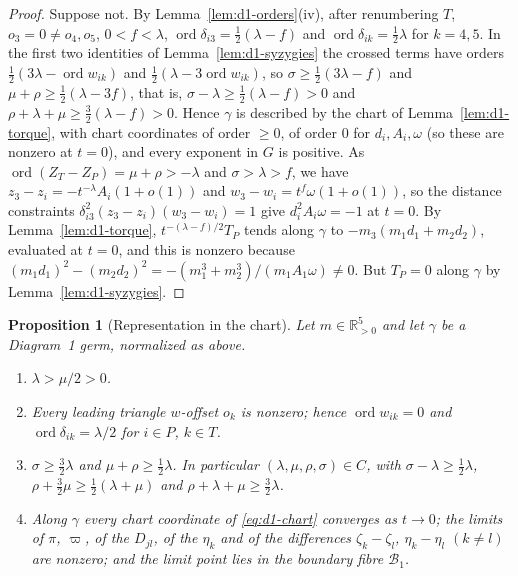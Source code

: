 \documentclass[Threeside,11pt]{article}
\newtheorem{proposition}[theorem]{Proposition}
\theoremstyle{definition}
\theoremstyle{remark}
\numberwithin{equation}{section}
\theoremstyle{remark}
\newcommand{\Rp}{\mathbb{R}_{>0}}
\newcommand{\ord}{\operatorname{ord}}
\newenvironment{romanlist}{\begin{enumerate}\renewcommand{\labelenumi}{(\roman{enumi})}%
  \renewcommand{\theenumi}{\roman{enumi}}}{\end{enumerate}}
\begin{document}
\begin{proof}
Suppose not.  By Lemma~\ref{lem:d1-orders}(iv), after renumbering $T$, $o_3=0\ne o_4,o_5$,
$0<f<\lambda$, $\ord\delta_{i3}=\frac12(\lambda-f)$ and $\ord\delta_{ik}=\frac12\lambda$ for $k=4,5$.
In the first two identities of Lemma~\ref{lem:d1-syzygies} the crossed terms have orders
$\frac12(3\lambda-\ord w_{ik})$ and $\frac12(\lambda-3\ord w_{ik})$, so
$\sigma\ge\frac12(3\lambda-f)$ and $\mu+\rho\ge\frac12(\lambda-3f)$, that is,
$\sigma-\lambda\ge\frac12(\lambda-f)>0$ and $\rho+\lambda+\mu\ge\frac32(\lambda-f)>0$.
Hence $\gamma$ is described by the chart of Lemma~\ref{lem:d1-torque}, with chart coordinates of
order $\ge0$, of order $0$ for $d_i,A_i,\omega$ (so these are nonzero at $t=0$), and every
exponent in $G$ is positive.
As $\ord(Z_T-Z_P)=\mu+\rho>-\lambda$ and $\sigma>\lambda>f$, we have $z_3-z_i=-t^{-\lambda}A_i(1+o(1))$
and $w_3-w_i=t^f\omega(1+o(1))$, so the distance constraints $\delta_{i3}^2(z_3-z_i)(w_3-w_i)=1$ give
$d_i^2A_i\omega=-1$ at $t=0$.
By Lemma~\ref{lem:d1-torque}, $t^{-(\lambda-f)/2}T_P$ tends along $\gamma$ to
$-m_3(m_1d_1+m_2d_2)$, evaluated at $t=0$, and this is nonzero because
$(m_1d_1)^2-(m_2d_2)^2=-(m_1^3+m_2^3)/(m_1A_1\omega)\ne0$.  But $T_P=0$ along $\gamma$ by
Lemma~\ref{lem:d1-syzygies}.
\end{proof}

\begin{proposition}[Representation in the chart]\label{prop:d1-cover}
Let $m\in\Rp^5$ and let $\gamma$ be a Diagram~1 germ, normalized as above.
\begin{romanlist}
  \item $\lambda>\mu/2>0$.
  \item Every leading triangle $w$-offset $o_k$ is nonzero; hence $\ord w_{ik}=0$ and
  $\ord\delta_{ik}=\lambda/2$ for $i\in P$, $k\in T$.
  \item $\sigma\ge\frac32\lambda$ and $\mu+\rho\ge\frac12\lambda$.  In particular
  $(\lambda,\mu,\rho,\sigma)\in C$, with $\sigma-\lambda\ge\frac12\lambda$,
  $\rho+\frac32\mu\ge\frac12(\lambda+\mu)$ and $\rho+\lambda+\mu\ge\frac32\lambda$.
  \item Along $\gamma$ every chart coordinate of \eqref{eq:d1-chart} converges as $t\to0$; the
  limits of $\pi$, $\varpi$, of the $D_{jl}$, of the $\eta_k$ and of the differences
  $\zeta_k-\zeta_l$, $\eta_k-\eta_l$ $(k\ne l)$ are nonzero; and the limit point lies in the
  boundary fibre $\mathcal B_1$.
\end{romanlist}
\end{proposition}
\end{document}
